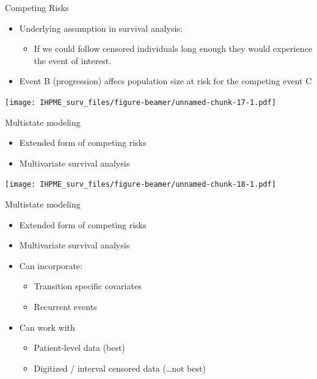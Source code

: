 \documentclass[
  ignorenonframetext,
]{beamer}
\providecommand{\tightlist}{%
  \setlength{\itemsep}{0pt}\setlength{\parskip}{0pt}}
\begin{document}
\begin{frame}{Competing Risks}
\protect\hypertarget{competing-risks}{}

\begin{itemize}
\tightlist
\item
  Underlying assumption in survival analysis:

  \begin{itemize}
  \tightlist
  \item
    If we could follow censored individuals long enough they would
    experience the event of interest.
  \end{itemize}
\item
  Event B (progression) affecs population size at risk for the competing
  event C
\end{itemize}

\end{frame}

\begin{frame}

\texttt{[image: IHPME\_surv\_files/figure-beamer/unnamed-chunk-17-1.pdf]}

\end{frame}

\begin{frame}{Multistate modeling}
\protect\hypertarget{multistate-modeling}{}

\begin{itemize}
\tightlist
\item
  Extended form of competing risks
\item
  Multivariate survival analysis
\end{itemize}

\texttt{[image: IHPME\_surv\_files/figure-beamer/unnamed-chunk-18-1.pdf]}

\end{frame}

\begin{frame}{Multistate modeling}
\protect\hypertarget{multistate-modeling-1}{}

\begin{itemize}
\tightlist
\item
  Extended form of competing risks
\item
  Multivariate survival analysis
\item
  Can incorporate:

  \begin{itemize}
  \tightlist
  \item
    Transition specific covariates
  \item
    Recurrent events
  \end{itemize}
\item
  Can work with

  \begin{itemize}
  \tightlist
  \item
    Patient-level data (best)
  \item
    Digitized / interval censored data (\ldots not best)
  \end{itemize}
\end{itemize}

\end{frame}
\end{document}
